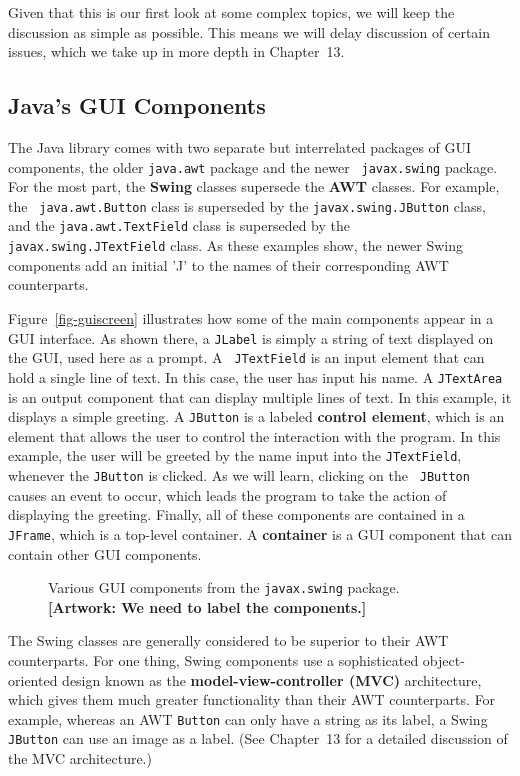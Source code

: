 Given that this is our first look at some complex topics, we will keep
the discussion as simple as possible. This means we will delay
discussion of certain issues, which we take up in more depth in
Chapter~13.

\subsection{Java's GUI Components}

The Java library comes with two separate but interrelated packages of
GUI components, the older {\tt java.awt} package and the newer {\tt
javax.swing} package.  For the most part, the {\bf Swing} classes
supersede the {\bf AWT} classes. For example, the {\tt
java.awt.Button} class is superseded by the {\tt javax.swing.JButton}
class, and the {\tt java.awt.TextField} class is superseded by the
{\tt javax.swing.JTextField} class.  As these examples show, the newer
Swing components add an initial 'J' to the names of their
corresponding AWT counterparts.

Figure~\ref{fig-guiscreen} illustrates how some of the main components
appear in a GUI interface. As shown there, a {\tt JLabel} is simply a
string of text displayed on the GUI, used here as a prompt. A {\tt
JTextField} is an input element that can hold a single line of text.
In this case, the user has input his name. A {\tt JTextArea} is an
output component that can display multiple lines of text. In this
example, it displays a simple greeting.  A {\tt JButton} is a labeled
{\bf control element}, which is an element that allows the user to
control the interaction with the program. In this example, the user
will be greeted by the name input into the {\tt JTextField}, whenever
the {\tt JButton} is clicked. As we will learn, clicking on the {\tt
JButton} causes an event to occur, which leads the program to take the
action of displaying the greeting.  Finally, all of these components
are contained in a {\tt JFrame}, which is a top-level container. A
{\bf container} is a GUI component that can contain other GUI
components.

\begin{figure}[tb]
{Various GUI components from the {\tt javax.swing} package. {\bf [Artwork: We
need to label the components.]}
\label{fig-guiscreen}
\label{pg-fig-guiscreen}}
\end{figure}

The Swing classes are generally considered to be superior to their AWT
counterparts. For one thing, Swing components use a sophisticated
object-oriented design known as the {\bf model-view-controller (MVC)}
architecture, which gives them much greater functionality than their
AWT counterparts. For example, whereas an AWT {\tt Button} can only
have a string as its label, a Swing {\tt JButton} can use an image as
a label. (See Chapter~13 for a detailed discussion of the MVC
architecture.)

